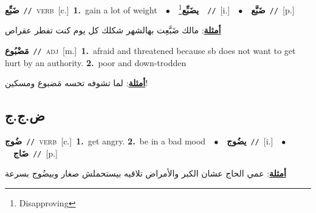 \documentclass[10pt,a4paper,twoside]{article} %
\begin{document}
\begin{multicols}{2}
{{{{{\setlength\topsep{0pt}\textbf{\foreignlanguage{arabic}{ضَبِّع}}\ {\color{gray}\texttt{//}\color{black}}\ \textsc{verb}\ [c.]\ \textbf{1.}~gain a lot of weight\ \ $\bullet$\ \ \setlength\topsep{0pt}\textbf{\foreignlanguage{arabic}{يضَبِّع}}\footnote{Disapproving}\ \ {\color{gray}\texttt{//}\color{black}}\ [i.]\ \ $\bullet$\ \ \setlength\topsep{0pt}\textbf{\foreignlanguage{arabic}{ضَبَّع}}\ {\color{gray}\texttt{//}\color{black}}\ [p.]\  \begin{flushright}\color{gray}\foreignlanguage{arabic}{\textbf{\underline{\foreignlanguage{arabic}{أمثلة}}}: مالك ضَبَّعِت بهالشهر شكلك كل يوم كنت تفطر عقراص}\end{flushright}\color{black}} \vspace{2mm}

{\setlength\topsep{0pt}\textbf{\foreignlanguage{arabic}{مَضْبُوع}}\ {\color{gray}\texttt{//}\color{black}}\ \textsc{adj}\ [m.]\ \textbf{1.}~afraid and threatened because sb does not want to get hurt by an authority.  \textbf{2.}~poor and down-trodden\  \begin{flushright}\color{gray}\foreignlanguage{arabic}{\textbf{\underline{\foreignlanguage{arabic}{أمثلة}}}: لما تشوفه تحسه مَضبوع ومسكين!}\end{flushright}\color{black}} \vspace{2mm}

\vspace{-3mm}
\subsection*{\color{blue}\foreignlanguage{arabic}{ض.ج.ج}\color{blue}{}} 

{\setlength\topsep{0pt}\textbf{\foreignlanguage{arabic}{ضُوج}}\ {\color{gray}\texttt{//}\color{black}}\ \textsc{verb}\ [c.]\ \textbf{1.}~get angry.  \textbf{2.}~be in a bad mood\ \ $\bullet$\ \ \setlength\topsep{0pt}\textbf{\foreignlanguage{arabic}{يضُوج}}\ {\color{gray}\texttt{//}\color{black}}\ [i.]\ \ $\bullet$\ \ \setlength\topsep{0pt}\textbf{\foreignlanguage{arabic}{ضَاج}}\ {\color{gray}\texttt{//}\color{black}}\ [p.]\  \begin{flushright}\color{gray}\foreignlanguage{arabic}{\textbf{\underline{\foreignlanguage{arabic}{أمثلة}}}: عمي الحاج عشان الكبر والأمراض تلاقيه بيستحملش صغار وبيضُوج بسرعة}\end{flushright}\color{black}} \vspace{2mm}

}}}}
\end{multicols}
\end{document}
